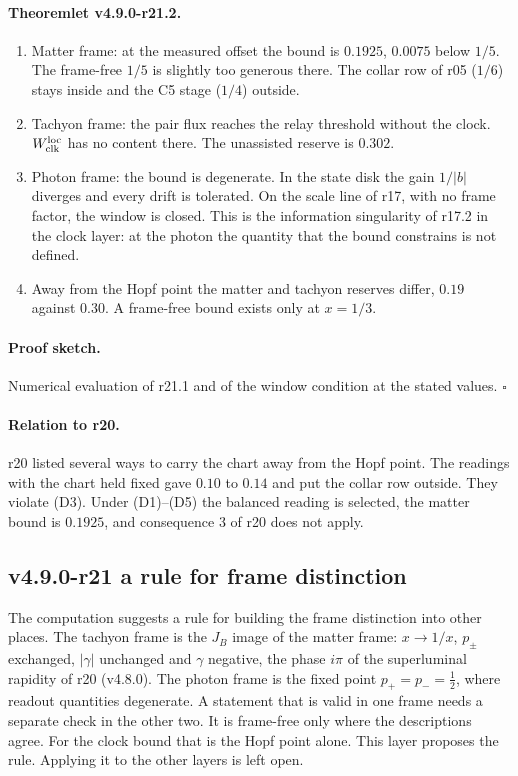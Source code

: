 \paragraph{Theoremlet v4.9.0-r21.2.}
\begin{enumerate}[leftmargin=2em]
\item[(a)] Matter frame: at the measured offset the bound is \(0.1925\), \(0.0075\) below \(1/5\).  The frame-free \(1/5\) is slightly
too generous there.  The collar row of r05 (\(1/6\)) stays inside and the C5 stage (\(1/4\)) outside.
\item[(b)] Tachyon frame: the pair flux reaches the relay threshold without the clock.  \(W_{\rm clk}^{\rm loc}\) has no content
there.  The unassisted reserve is \(0.302\).
\item[(c)] Photon frame: the bound is degenerate.  In the state disk the gain \(1/|b|\) diverges and every drift is tolerated.
On the scale line of r17, with no frame factor, the window is closed.  This is the information singularity of r17.2 in the
clock layer: at the photon the quantity that the bound constrains is not defined.
\item[(d)] Away from the Hopf point the matter and tachyon reserves differ, \(0.19\) against \(0.30\).  A frame-free bound
exists only at \(x=1/3\).
\end{enumerate}

\paragraph{Proof sketch.}
Numerical evaluation of r21.1 and of the window condition at the stated values.  \(\square\)

\paragraph{Relation to r20.}
r20 listed several ways to carry the chart away from the Hopf point.  The readings with the chart held fixed gave \(0.10\) to
\(0.14\) and put the collar row outside.  They violate (D3).  Under (D1)--(D5) the balanced reading is selected, the matter bound
is \(0.1925\), and consequence 3 of r20 does not apply.

\subsection*{v4.9.0-r21 a rule for frame distinction}
\label{subsec:v490-r21-rule}

The computation suggests a rule for building the frame distinction into other places.  The tachyon frame is the \(J_B\) image
of the matter frame: \(x\to1/x\), \(p_\pm\) exchanged, \(|\gamma|\) unchanged and \(\gamma\) negative, the phase \(i\pi\) of the
superluminal rapidity of r20 (v4.8.0).  The photon frame is the fixed point \(p_+=p_-=\tfrac12\), where readout quantities
degenerate.  A statement that is valid in one frame needs a separate check in the other two.  It is frame-free only where the
descriptions agree.  For the clock bound that is the Hopf point alone.  This layer proposes the rule.  Applying it to the other
layers is left open.

